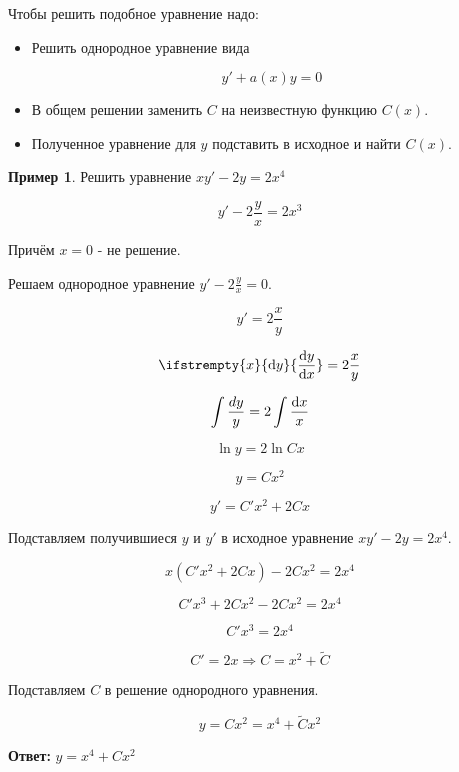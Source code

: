 \documentclass[a4paper, 14pt]{article}
\newcommand{\dx}{\mathrm{d}x}
\newcommand{\dy}{\mathrm{d}y}
\newcommand{\dv}[2]{%
  \ifstrempty{#2}%
    {\mathrm{d}#1}%
    {\frac{\mathrm{d}#1}{\mathrm{d}#2}}%
}
\theoremstyle{definition}
\newtheorem*{example}{Пример}
\newenvironment{answer}
  {\par\noindent\textbf{Ответ:}}
  {\par}
\begin{document}
Чтобы решить подобное уравнение надо:
\begin{itemize}
\item \textbf{}Решить однородное уравнение вида

\[y' + a(x)y = 0\]

\item \textbf{}В общем решении заменить $C$ на неизвестную функцию $C(x)$.

\item \textbf{}Полученное уравнение для $y$ подставить в исходное и найти $C(x)$.
\end{itemize}
\begin{example}
    Решить уравнение $xy'-2y=2x^4$

    \[y'-2\frac{y}{x} = 2x^3\]

    Причём $x=0$ - не решение.

    Решаем однородное уравнение $y'-2\frac{y}{x} = 0$.

    \[y'=2\frac{x}{y}\]

    \[\dv{y}{x} = 2\frac{x}{y}\]

    \[\int{\frac{\\dy}{y}} = 2\int{\frac{\dx}{x}}\]

    \[\ln{y} = 2\ln{Cx}\]

    \[y = Cx^2\]

    \[y' = C'x^2+2Cx\]

Подставляем получившиеся $y$ и $y'$ в исходное уравнение $xy'-2y=2x^4$.

\[x(C'x^2+2Cx)- 2Cx^2 = 2x^4\]

\[C'x^3+2Cx^2- 2Cx^2 = 2x^4\]

\[C'x^3= 2x^4\]

\[C'= 2x \Longrightarrow C=x^2+\tilde{C}\]

Подставляем $C$ в решение однородного уравнения.

\[y = Cx^2 = x^4+\tilde{C}x^2\]
\end{example}
\begin{answer}
    $y= x^4+Cx^2$
\end{answer}
\end{document}
